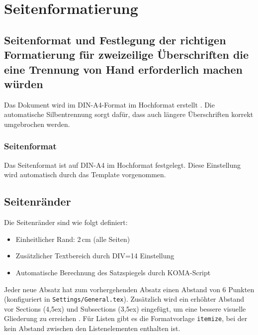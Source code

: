 
\chapter{Seitenformatierung}
\label{chap:seitenformatierung}

\section{Seitenformat und Festlegung der richtigen Formatierung für zweizeilige Überschriften die eine Trennung von Hand erforderlich machen würden}
\label{sec:seitenformat}

Das Dokument wird im DIN-A4-Format im Hochformat erstellt \parencite{hahner2011}. Die automatische Silbentrennung sorgt dafür, dass auch längere Überschriften korrekt umgebrochen werden.

\subsection*{Seitenformat}
\label{subsec:seitenformat_detail}

Das Seitenformat ist auf DIN-A4 im Hochformat festgelegt. Diese Einstellung wird automatisch durch das Template vorgenommen.

\section{Seitenränder}
\label{sec:seitenraender}

Die Seitenränder sind wie folgt definiert:
\begin{itemize}
	\item Einheitlicher Rand: 2\,cm (alle Seiten)
	\item Zusätzlicher Textbereich durch DIV=14 Einstellung
	\item Automatische Berechnung des Satzspiegels durch KOMA-Script
\end{itemize}

Jeder neue Absatz hat zum vorhergehenden Absatz einen Abstand von 6 Punkten (konfiguriert in \texttt{Settings/General.tex}). Zusätzlich wird ein erhöhter Abstand vor Sections (4,5ex) und Subsections (3,5ex) eingefügt, um eine bessere visuelle Gliederung zu erreichen \parencite{theisen2013}. Für Listen gibt es die Formatvorlage \texttt{itemize}, bei der kein Abstand zwischen den Listenelementen enthalten ist.

